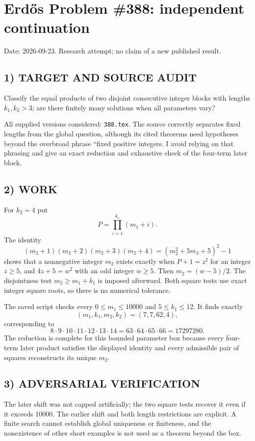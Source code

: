 \section{Erd\H{o}s Problem \#388: independent continuation}
\noindent Date: 2026-09-23. Research attempt; no claim of a new published result.
\subsection{1) TARGET AND SOURCE AUDIT}
Classify the equal products of two disjoint consecutive integer blocks with lengths $k_1,k_2>3$; are there finitely many solutions when all parameters vary?

All supplied versions considered: \texttt{388.tex}.
The source correctly separates fixed lengths from the global question, although its cited theorems need hypotheses beyond the overbroad phrase ``fixed positive integers. I avoid relying on that phrasing and give an exact reduction and exhaustive check of the four-term later block.
\subsection{2) WORK}
For $k_2=4$ put
\[
P=\prod_{i=1}^{k_1}(m_1+i).
\]
The identity
\[
(m_2+1)(m_2+2)(m_2+3)(m_2+4)=(m_2^2+5m_2+5)^2-1
\]
shows that a nonnegative integer $m_2$ exists exactly when $P+1=z^2$ for an integer $z\ge5$, and $4z+5=w^2$ with an odd integer $w\ge5$. Then $m_2=(w-5)/2$. The disjointness test $m_2\ge m_1+k_1$ is imposed afterward. Both square tests use exact integer square roots, so there is no numerical tolerance.

The saved script checks every $0\le m_1\le10000$ and $5\le k_1\le12$. It finds exactly
\[
(m_1,k_1,m_2,k_2)=(7,7,62,4),
\]
corresponding to
\[
8\cdot9\cdot10\cdot11\cdot12\cdot13\cdot14
=63\cdot64\cdot65\cdot66=17297280.
\]
The reduction is complete for this bounded parameter box because every four-term later product satisfies the displayed identity and every admissible pair of squares reconstructs its unique $m_2$.
\subsection{3) ADVERSARIAL VERIFICATION}
The later shift was not capped artificially; the two square tests recover it even if it exceeds 10000. The earlier shift and both length restrictions are explicit. A finite search cannot establish global uniqueness or finiteness, and the nonexistence of other short examples is not used as a theorem beyond the box.
